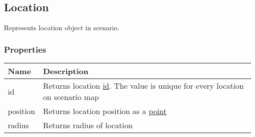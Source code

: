 \subsection{Location}
\label{Location}
Represents location object in scenario.
\subsubsection{Properties}
\begin{center}
\begin{tabularx}{\linewidth}{| l | X |}
\hline
\textbf{Name} & \textbf{Description} \\
\hline
id & Returns location \hyperref[Id]{id}. The value is unique for every location on scenario map\\
\hline
position & Returns location position as a \hyperref[Point]{point}\\
\hline
radius & Returns radius of location\\
\hline
\end{tabularx}
\end{center}